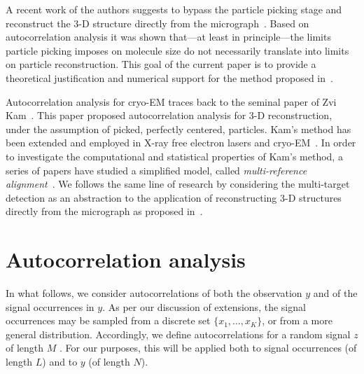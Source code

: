 \documentclass[12pt]{article}
\newcommand{\1}{\mathbf{1}}
\newcommand{\TODO}[1]{{\color{red}{[#1]}}}
\theoremstyle{plain}
\theoremstyle{definition}
\theoremstyle{remark}
\theoremstyle{plain}
\theoremstyle{remark}
\theoremstyle{plain}
\theoremstyle{plain}
\theoremstyle{plain}
\numberwithin{equation}{section}
\begin{document}
A recent work of the authors suggests to bypass the particle picking stage and  reconstruct the 3-D structure directly from the micrograph~\cite{bendory2018toward}.
Based on autocorrelation analysis it was shown that---at least in principle---the limits particle picking imposes on molecule size do not necessarily  translate into limits on particle reconstruction.
This goal of  the current paper is to provide a theoretical justification and numerical support  for the method proposed in~\cite{bendory2018toward}.  


Autocorrelation analysis for cryo-EM traces back to the seminal paper of Zvi Kam~\cite{kam1980reconstruction}. This paper proposed autocorrelation analysis for {3-D} reconstruction, under the assumption of picked, perfectly centered, particles. Kam's method has been extended and employed in X-ray free electron lasers and cryo-EM~\cite{liu2013three,kurta2017correlations,levin20173d,von2018structure}.  
In order to investigate the computational and statistical properties of Kam's method, a series of papers have studied a simplified model, 
called   \emph{multi-reference alignment}~\cite{bandeira2014multireference,bendory2017bispectrum,bandeira2017optimal,perry2017sample,bandeira2017estimation,abbe2017multireference}.
We follows the same line of research by considering the multi-target detection as an abstraction to the application of reconstructing 3-D structures directly from the micrograph as proposed in~\cite{bendory2018toward}.
\TODO{Not sure about the location of the last paragraph.}

\section{Autocorrelation analysis} \label{sec:AC_analysis}

In what follows, we consider autocorrelations of both the observation $y$ and of the signal occurrences in $y$. As per our discussion of extensions, the signal occurrences may be sampled from a discrete set $\{x_1, \ldots, x_K\}$, or from a more general distribution. Accordingly, we define autocorrelations for a random signal $z$ of length $M$ . For our purposes, this will be applied both to signal occurrences (of length $L$) and to $y$ (of length $N$).
\end{document}
